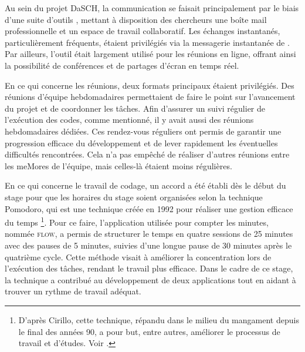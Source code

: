     Au sein du projet DaSCH, la communication se faisait principalement par le biais d'une suite d'outils , mettant à disposition des chercheurs une boîte mail professionnelle et un espace de travail collaboratif. Les échanges instantanés, particulièrement fréquents, étaient privilégiés via la messagerie instantanée de . Par ailleurs, l'outil  était largement utilisé pour les réunions en ligne, offrant ainsi la possibilité de conférences et de partages d'écran en temps réel.

    En ce qui concerne les réunions, deux formats principaux étaient privilégiés. Des réunions d'équipe hebdomadaires permettaient de faire le point sur l'avancement du projet et de coordonner les tâches. Afin d'assurer un suivi régulier de l'exécution des codes, comme mentionné, il y avait aussi des réunions hebdomadaires dédiées. Ces rendez-vous réguliers ont permis de garantir une progression efficace du développement et de lever rapidement les éventuelles difficultés rencontrées. Cela n'a pas empêché de réaliser d'autres réunions entre les meMores de l'équipe, mais celles-là étaient moins régulières. 
    
    En ce qui concerne le travail de codage, un accord a été établi dès le début du stage pour que les horaires du stage soient organisées selon la technique Pomodoro, qui est une technique créée en 1992 pour réaliser une gestion efficace du temps \footnote{D'après Cirillo, cette technique, répandu dans le milieu du mangament depuis le final des années 90, a pour but, entre autres, améliorer le processus de travail et d'études. Voir \cite[p.~20]{cirillo2009}.}. Pour ce faire, l’application utilisée pour compter les minutes, nommée \textsc{flow}, a permis de structurer le temps en quatre sessions de 25 minutes avec des pauses de 5 minutes, suivies d’une longue pause de 30 minutes après le quatrième cycle. Cette méthode visait à améliorer la concentration lors de l’exécution des tâches, rendant le travail plus efficace. Dans le cadre de ce stage, la technique a contribué au développement de deux applications tout en aidant à trouver un rythme de travail adéquat.

